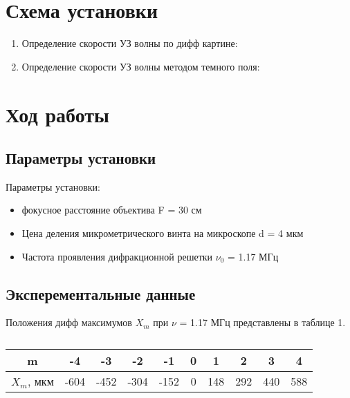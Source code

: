 

\section{Схема установки}

\begin{enumerate}
    \item Определение скорости УЗ волны по дифф картине:

    \vspace{3cm}

    \item Определение скорости УЗ волны методом темного поля:
    
\end{enumerate}

\newpage

\section{Ход работы}

\subsection{Параметры установки}

Параметры установки:
\begin{itemize}
    \item фокусное расстояние объектива F = 30 см
    \item Цена деления микрометрического винта на микроскопе d = 4 мкм
    \item Частота проявления дифракционной решетки $\nu_0$ = 1.17 МГц
\end{itemize}

\subsection{Эксперементальные данные}

Положения дифф максимумов $X_m$ при $\nu$ = 1.17 МГц представлены в таблице 1.
\begin{table}[h!]
\begin{center}
    \caption{}
    \begin{tabular}{|c|c|c|c|c|c|c|c|c|c|}
    \hline
    m          & -4   & -3   & -2   & -1   & 0 & 1   & 2   & 3   & 4   \\ \hline
    $X_m$, мкм & -604 & -452 & -304 & -152 & 0 & 148 & 292 & 440 & 588 \\ \hline
    \end{tabular}
\end{center}
\end{table}

